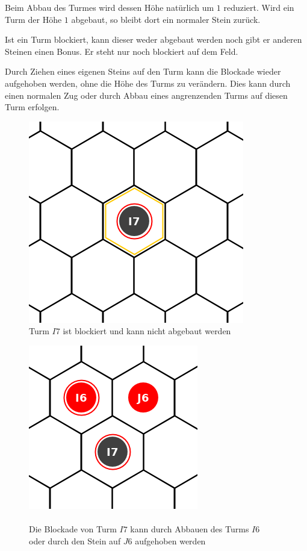 Beim Abbau des Turmes wird dessen Höhe natürlich um $1$ reduziert. Wird ein Turm der Höhe $1$ abgebaut, so bleibt dort ein normaler Stein zurück.

Ist ein Turm blockiert, kann dieser weder abgebaut werden noch gibt er anderen Steinen einen Bonus. Er steht nur noch blockiert auf dem Feld. 

Durch Ziehen eines eigenen Steins auf den Turm kann die Blockade wieder aufgehoben werden, ohne die Höhe des Turms zu verändern. Dies kann durch einen normalen Zug oder durch Abbau eines angrenzenden Turms auf diesen Turm erfolgen.
\newpage
\begin{figure}[ht]
\begin{center}
\includegraphics[scale=0.25]{graphic/tower-blocked.png}
\end{center}
\caption*{Turm $I7$ ist blockiert und kann nicht abgebaut werden}
\end{figure}

\begin{figure}[ht]
\begin{center}
\includegraphics[scale=0.25]{graphic/tower-unblock.png} \\
\hspace{10pt}\\
Die Blockade von Turm $I7$ kann durch Abbauen des Turms $I6$\\ oder durch den Stein auf $J6$ aufgehoben werden
\end{center}
\end{figure}

